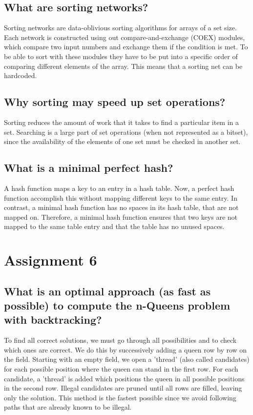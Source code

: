 \documentclass[runningheads]{llncs}
\begin{document}
\subsection*{What are sorting networks?}
Sorting networks are data-oblivious sorting algorithms for arrays of a set size. Each network is constructed using out compare-and-exchange
(COEX) modules, which compare two input numbers and exchange them if the condition is met. To be able to sort with these modules they have to be
put into a specific order of comparing different elements of the array. This means that a sorting net can be hardcoded.

\subsection*{Why sorting may speed up set operations?} %
Sorting reduces the amount of work that it takes to find a particular item in a set. Searching is a large part of set operations (when not
represented as a bitset), since the availability of the elements of one set must be checked in another set.

\subsection*{What is a minimal perfect hash?}
A hash function maps a key to an entry in a hash table. Now, a perfect hash function accomplish this without mapping different keys to the same entry.
In contrast, a minimal hash function has no spaces in its hash table, that are not mapped on. Therefore, a minimal hash function ensures that two keys
are not mapped to the same table entry and that the table has no unused spaces.

\section*{Assignment 6}

\subsection*{What is an optimal approach (as fast as possible) to compute the n-Queens problem with backtracking?}
To find all correct solutions, we must go through all possibilities and to check which ones are correct. We do this by successively adding a queen row by row on
the field. Starting with an empty field, we open a 'thread' (also called candidates) for each possible position where the queen can stand in the first row.
For each candidate, a 'thread' is added which positions the queen in all possible positions in the second row. Illegal candidates are pruned until all
rows are filled, leaving only the solution. This method is the fastest possible since we avoid following paths that are already known to be illegal.
\end{document}

